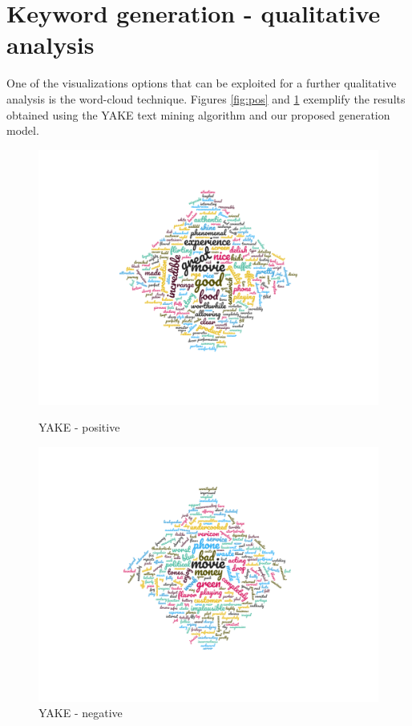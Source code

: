 \section{Keyword generation - qualitative analysis}\label{cloudwords}
One of the visualizations options that can be exploited for a further qualitative analysis is the word-cloud technique. Figures \ref{fig:pos} and \ref{fig:neg} exemplify the results obtained using the YAKE text mining algorithm and our proposed generation model.
\begin{figure}[H]
  \centering
  \minipage{\textwidth}
  \includegraphics[width=\linewidth]{Images/yake_pos.png}
  \caption{YAKE - positive}
  \label{fig:pos}
\endminipage\hfill
  \minipage{\textwidth}
  \includegraphics[width=\linewidth]{Images/yake_neg.png}
  \caption{YAKE - negative}
  \label{fig:neg}
\endminipage\hfill
\end{figure}%
